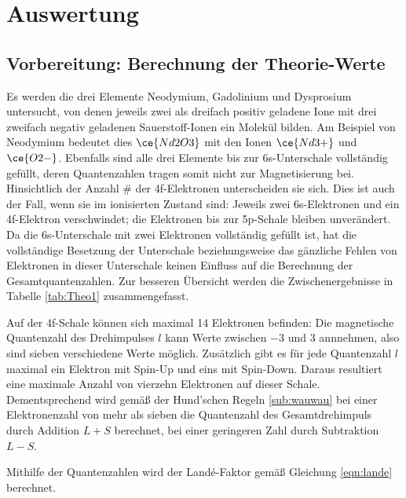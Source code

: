 \section{Auswertung}
\label{sec:Auswertung}

\subsection{Vorbereitung: Berechnung der Theorie-Werte}

    Es werden die drei Elemente Neodymium, Gadolinium und Dysprosium untersucht, von denen jeweils zwei als dreifach positiv geladene 
    Ione mit drei zweifach negativ geladenen Sauerstoff-Ionen ein Molekül bilden. 
    Am Beispiel von Neodymium bedeutet dies $\ce{Nd2O3}$ mit den Ionen $\ce{Nd3+}$ und $\ce{O2-}$.
    Ebenfalls sind alle drei Elemente bis zur 6s-Unterschale vollständig gefüllt, deren Quantenzahlen tragen somit nicht zur Magnetisierung bei. 
    Hinsichtlich der Anzahl \# der 4f-Elektronen unterscheiden sie sich. 
    Dies ist auch der Fall, wenn sie im ionisierten Zustand sind: 
    Jeweils zwei 6s-Elektronen und ein 4f-Elektron verschwindet; die Elektronen bis zur 5p-Schale bleiben unverändert. 
    Da die 6s-Unterschale mit zwei Elektronen vollständig gefüllt ist, hat die vollständige Besetzung der Unterschale beziehungsweise 
    das gänzliche Fehlen von Elektronen in dieser Unterschale keinen Einfluss auf die Berechnung der Gesamtquantenzahlen. 
    Zur besseren Übersicht werden die Zwischenergebnisse in Tabelle \ref{tab:Theo1} zusammengefasst. 

    Auf der 4f-Schale können sich maximal 14 Elektronen befinden: 
    Die magnetische Quantenzahl des Drehimpulses $l$ kann Werte zwischen $-3$ und $3$ annnehmen, also sind sieben verschiedene Werte möglich. 
    Zusätzlich gibt es für jede Quantenzahl $l$ maximal ein Elektron mit Spin-Up und eins mit Spin-Down. Daraus resultiert eine maximale Anzahl von vierzehn Elektronen auf dieser Schale. 
    Dementsprechend wird gemäß der Hund'schen Regeln \ref{sub:wauwau} bei einer Elektronenzahl von mehr als sieben 
    die Quantenzahl des Gesamtdrehimpuls durch Addition $L+S$ berechnet, bei einer geringeren Zahl durch Subtraktion $L-S$. 

    Mithilfe der Quantenzahlen wird der Landé-Faktor gemäß Gleichung \eqref{eqn:lande} berechnet. 


